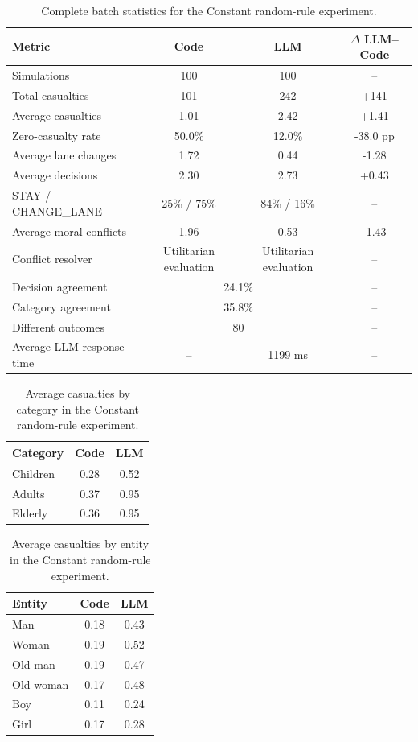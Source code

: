 \documentclass[10pt,a4paper]{article}
\begin{document}
\begin{table}[H]
\centering
\small
\begin{tabular}{lccc}
\toprule
Metric & Code & LLM & $\Delta$ LLM--Code \\
\midrule
Simulations & 100 & 100 & -- \\
Total casualties & 101 & 242 & +141 \\
Average casualties & 1.01 & 2.42 & +1.41 \\
Zero-casualty rate & 50.0\% & 12.0\% & -38.0 pp \\
Average lane changes & 1.72 & 0.44 & -1.28 \\
Average decisions & 2.30 & 2.73 & +0.43 \\
STAY / CHANGE\_LANE & 25\% / 75\% & 84\% / 16\% & -- \\
Average moral conflicts & 1.96 & 0.53 & -1.43 \\
Conflict resolver & Utilitarian evaluation & Utilitarian evaluation & -- \\
Decision agreement & \multicolumn{2}{c}{24.1\%} & -- \\
Category agreement & \multicolumn{2}{c}{35.8\%} & -- \\
Different outcomes & \multicolumn{2}{c}{80} & -- \\
Average LLM response time & -- & 1199 ms & -- \\
\bottomrule
\end{tabular}
\caption{Complete batch statistics for the Constant random-rule experiment.}
\label{tab:app-constant-random}
\end{table}


\begin{table}[H]
\centering
\small
\begin{tabular}{lcc}
\toprule
Category & Code & LLM \\
\midrule
Children & 0.28 & 0.52 \\
Adults   & 0.37 & 0.95 \\
Elderly  & 0.36 & 0.95 \\
\bottomrule
\end{tabular}
\caption{Average casualties by category in the Constant random-rule experiment.}
\label{tab:app-constant-random-categories}
\end{table}


\begin{table}[H]
\centering
\small
\begin{tabular}{lcc}
\toprule
Entity & Code & LLM \\
\midrule
Man       & 0.18 & 0.43 \\
Woman     & 0.19 & 0.52 \\
Old man   & 0.19 & 0.47 \\
Old woman & 0.17 & 0.48 \\
Boy       & 0.11 & 0.24 \\
Girl      & 0.17 & 0.28 \\
\bottomrule
\end{tabular}
\caption{Average casualties by entity in the Constant random-rule experiment.}
\label{tab:app-constant-random-entities}
\end{table}
\end{document}
